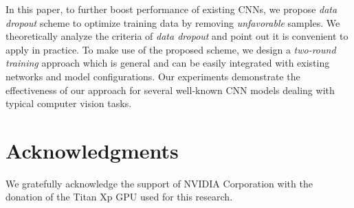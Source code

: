 \documentclass[10pt, conference, letterpaper]{IEEEtran}
\begin{document}
In this paper, to further boost performance of existing CNNs, we propose \emph{data dropout} scheme to optimize training data by removing \emph{unfavorable} samples. We theoretically analyze the criteria of \emph{data dropout} and point out it is convenient to apply in practice. To make use of the proposed scheme, we design a \emph{two-round training} approach which is general and can be easily integrated with existing networks and model configurations. Our experiments demonstrate the effectiveness of our approach for several well-known CNN models dealing with typical computer vision tasks.


\section*{Acknowledgments}

We gratefully acknowledge the support of NVIDIA Corporation with the donation of the Titan Xp GPU used for this research.



  
   
\end{document}

